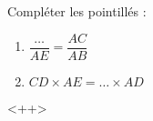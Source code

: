 
\begin{mental}
    \begin{center}
        \large

    \end{center}
    Compléter les pointillés :
    \begin{enumerate}
        \item
            \( \dfrac{ \ldots }{ AE }=\dfrac{ AC }{ AB }\)
        \item
        $CD\times AE=\ldots \times AD$
    \end{enumerate}
\end{mental}
<++>
